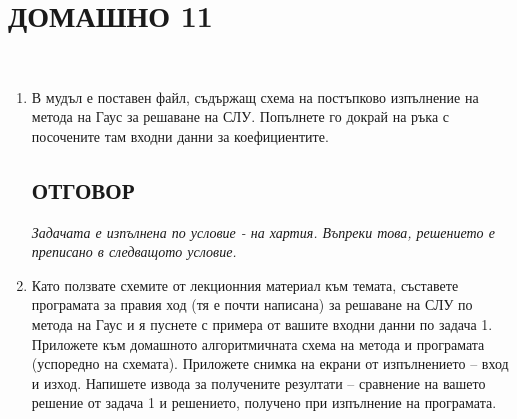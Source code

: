 \documentclass[12pt, a4paper]{article}
\begin{document}
	\section{ДОМАШНО 11}
	\\
		\begin{enumerate}
			\item В мудъл е поставен файл, съдържащ схема на постъпково изпълнение на метода на Гаус за решаване на СЛУ. Попълнете го докрай на ръка с посочените там входни данни за коефициентите.
			\subsection{ОТГОВОР}
			{\color{blue!50!black}
				\textit{
					Задачата е изпълнена по условие - на хартия.
					Въпреки това, решението е преписано в следващото условие.
				}
				
			}
			\item Като ползвате схемите от лекционния материал към темата, съставете програмата за правия ход (тя е почти написана) за решаване на СЛУ по метода на Гаус и я пуснете с примера от вашите входни данни по задача 1. Приложете към домашното алгоритмичната схема на метода и програмата (успоредно на схемата). Приложете снимка на екрани от изпълнението – вход и изход. Напишете извода за получените резултати – сравнение на вашето решение от задача 1 и решението, получено при изпълнение на програмата.

\end{enumerate}
\end{document}
